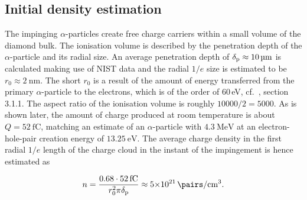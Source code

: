 
\subsection{Initial density estimation}

The impinging $\alpha$-particles create free charge carriers within a small volume of the diamond bulk. 
The ionisation volume is described by the penetration depth of the $\alpha$-particle and its radial size. 
An average penetration depth of $\delta_{\textrm{p}} \approx \SI{10}{\micro\meter}$ is calculated making use of NIST data
 and the radial $1/e$ size is estimated to be $r_0 \approx \SI{2}{\nm}$. 
The short $r_0$ is a result of the amount of energy transferred from the primary $\alpha$-particle to the electrons, 
 which is of the order of 60\,eV, cf.\ \cite{JansenThesis}, section 3.1.1. 
The aspect ratio of the ionisation volume is roughly $\num{10000}/\num{2} = \num{5000}$. 
As is shown later, the amount of charge produced at room temperature is about $Q = \SI{52}{\femto\coulomb}$,
 matching an estimate of an $\alpha$-particle with $\SI{4.3}{\mega\eV}$ at an electron-hole-pair creation energy of $\SI{13.25}{\eV}$. 
The average charge density in the first radial $1/e$ length of the charge cloud in the instant of the impingement is hence estimated as 

\begin{equation}
 n = \frac{0.68\cdot\SI{52}{\femto\coulomb}}{r_0^2\pi \dpen} \approx \SI{5e21}{\pairs/\cm^{3}}.
\end{equation}

